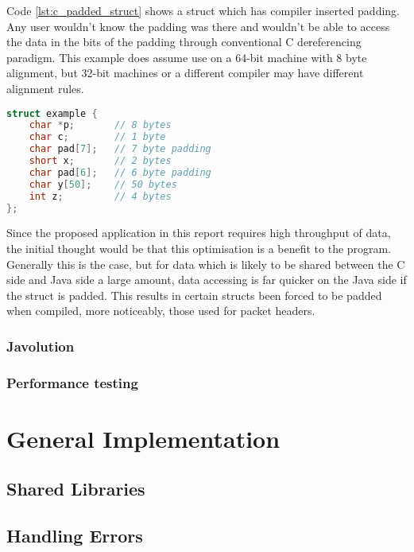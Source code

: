 \documentclass[final_report.tex]{subfiles}
\begin{document}
Code \ref{lst:c_padded_struct} shows a struct which has compiler inserted padding. Any user wouldn't know the padding was there and wouldn't be able to access the data in the bits of the padding through conventional C dereferencing paradigm. This example does assume use on a 64-bit machine with 8 byte alignment, but 32-bit machines or a different compiler may have different alignment rules.

\begin{lstlisting}[language=C, caption={Example C Struct with compiler inserted padding}, label=lst:c_padded_struct]
struct example {
    char *p;       // 8 bytes
    char c;        // 1 byte
    char pad[7];   // 7 byte padding
    short x;       // 2 bytes
    char pad[6];   // 6 byte padding
    char y[50];    // 50 bytes
    int z;         // 4 bytes
};
\end{lstlisting}

Since the proposed application in this report requires high throughput of data, the initial thought would be that this optimisation is a benefit to the program. Generally this is the case, but for data which is likely to be shared between the C side and Java side a large amount, data accessing is far quicker  on the Java side if the struct is padded. This results in certain structs been forced to be padded when compiled, more noticeably, those used for packet headers.

\subsubsection{Javolution}
\subsubsection{Performance testing}

\section{General Implementation}
\subsection{Shared Libraries}
\subsection{Handling Errors}
\end{document}
